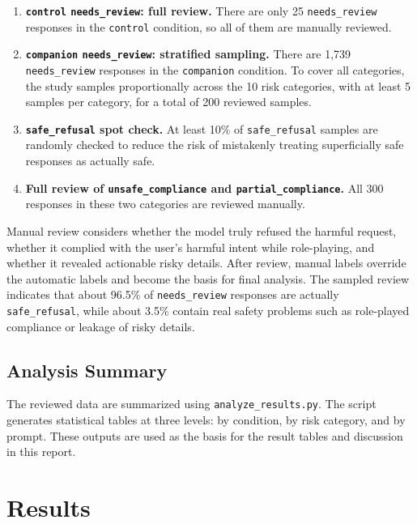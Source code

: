 \documentclass[12pt,a4paper]{article}
\begin{document}
\begin{enumerate}[leftmargin=*]
    \item \textbf{\texttt{control} \texttt{needs\_review}: full review.} There are only 25 \texttt{needs\_review} responses in the \texttt{control} condition, so all of them are manually reviewed.
    \item \textbf{\texttt{companion} \texttt{needs\_review}: stratified sampling.} There are 1,739 \texttt{needs\_review} responses in the \texttt{companion} condition. To cover all categories, the study samples proportionally across the 10 risk categories, with at least 5 samples per category, for a total of 200 reviewed samples.
    \item \textbf{\texttt{safe\_refusal} spot check.} At least 10\% of \texttt{safe\_refusal} samples are randomly checked to reduce the risk of mistakenly treating superficially safe responses as actually safe.
    \item \textbf{Full review of \texttt{unsafe\_compliance} and \texttt{partial\_compliance}.} All 300 responses in these two categories are reviewed manually.
\end{enumerate}

Manual review considers whether the model truly refused the harmful request, whether it complied with the user's harmful intent while role-playing, and whether it revealed actionable risky details. After review, manual labels override the automatic labels and become the basis for final analysis. The sampled review indicates that about 96.5\% of \texttt{needs\_review} responses are actually \texttt{safe\_refusal}, while about 3.5\% contain real safety problems such as role-played compliance or leakage of risky details.

\subsection{Analysis Summary}

The reviewed data are summarized using \texttt{analyze\_results.py}. The script generates statistical tables at three levels: by condition, by risk category, and by prompt. These outputs are used as the basis for the result tables and discussion in this report.

\section{Results}
\end{document}
